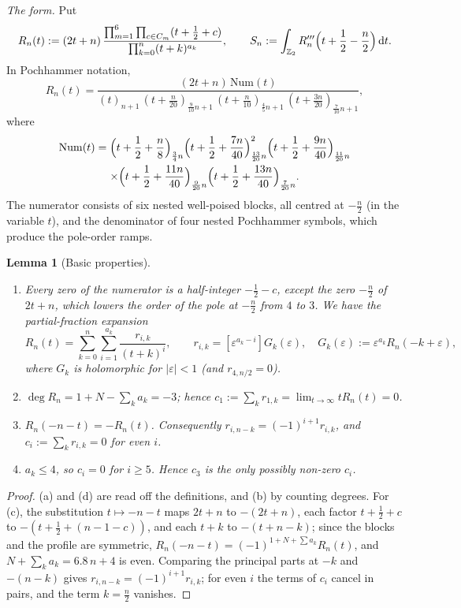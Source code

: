 \documentclass{amsart}
\newtheorem{lemma}[theorem]{Lemma}
\theoremstyle{definition}
\theoremstyle{remark}
\numberwithin{equation}{section}
\newcommand{\Z}{\mathbb{Z}}
\newcommand{\dd}{\,\mathrm{d}}
\begin{document}
\emph{The form.} Put
\begin{equation}\label{eq:R}
  R_n(t):=(2t+n)\,\frac{\prod_{m=1}^{6}\prod_{c\in C_m}(t+\frac12+c)}{\prod_{k=0}^{n}(t+k)^{a_k}},
  \qquad
  S_n:=\int_{\Z_2}R_n'''\Bigl(t+\frac12-\frac n2\Bigr)\dd t .
\end{equation}
In Pochhammer notation,
\[
  R_n(t)=\frac{(2t+n)\,\mathrm{Num}(t)}{(t)_{n+1}\,(t+\frac n{20})_{\frac9{10}n+1}\,(t+\frac n{10})_{\frac45n+1}\,(t+\frac{3n}{20})_{\frac7{10}n+1}},
\]
where
\begin{multline*}
  \mathrm{Num}(t)=\Bigl(t+\frac12+\frac n8\Bigr)_{\frac34n}\Bigl(t+\frac12+\frac{7n}{40}\Bigr)_{\frac{13}{20}n}^2
  \Bigl(t+\frac12+\frac{9n}{40}\Bigr)_{\frac{11}{20}n}\\
  \times\Bigl(t+\frac12+\frac{11n}{40}\Bigr)_{\frac9{20}n}
  \Bigl(t+\frac12+\frac{13n}{40}\Bigr)_{\frac7{20}n}.
\end{multline*}
The numerator consists of six nested well-poised blocks, all centred at
$-\frac n2$ (in the variable $t$), and the denominator of four nested
Pochhammer symbols, which produce the pole-order ramps.

\begin{lemma}[Basic properties]\label{lem:basic}
\begin{enumerate}
\item[(a)] Every zero of the numerator is a half-integer $-\frac12-c$, except
  the zero $-\frac n2$ of $2t+n$, which lowers the order of the pole at
  $-\frac n2$ from $4$ to $3$. We have the partial-fraction expansion
  \[
    R_n(t)=\sum_{k=0}^{n}\sum_{i=1}^{a_k}\frac{r_{i,k}}{(t+k)^i},\qquad
    r_{i,k}=[\varepsilon^{a_k-i}]G_k(\varepsilon),\quad
    G_k(\varepsilon):=\varepsilon^{a_k}R_n(-k+\varepsilon),
  \]
  where $G_k$ is holomorphic for $|\varepsilon|<1$ (and $r_{4,n/2}=0$).
\item[(b)] $\deg R_n=1+N-\sum_ka_k=-3$; hence
  $c_1:=\sum_kr_{1,k}=\lim_{t\to\infty}tR_n(t)=0$.
\item[(c)] $R_n(-n-t)=-R_n(t)$. Consequently $r_{i,n-k}=(-1)^{i+1}r_{i,k}$,
  and $c_i:=\sum_kr_{i,k}=0$ for even $i$.
\item[(d)] $a_k\le4$, so $c_i=0$ for $i\ge5$. Hence $c_3$ is the only
  possibly non-zero $c_i$.
\end{enumerate}
\end{lemma}

\begin{proof}
(a) and (d) are read off the definitions, and (b) by counting degrees. For
(c), the substitution $t\mapsto-n-t$ maps $2t+n$ to $-(2t+n)$, each factor
$t+\frac12+c$ to $-(t+\frac12+(n-1-c))$, and each $t+k$ to $-(t+n-k)$; since
the blocks and the profile are symmetric,
$R_n(-n-t)=(-1)^{1+N+\sum a_k}R_n(t)$, and $N+\sum_ka_k=6.8\,n+4$ is even.
Comparing the principal parts at $-k$ and $-(n-k)$ gives
$r_{i,n-k}=(-1)^{i+1}r_{i,k}$; for even $i$ the terms of $c_i$ cancel in
pairs, and the term $k=\frac n2$ vanishes.
\end{proof}
\end{document}
